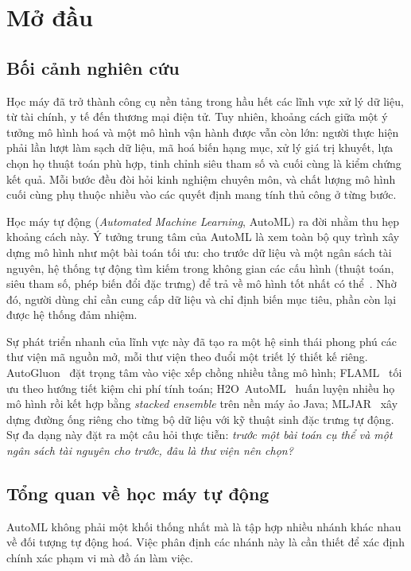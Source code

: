 \chapter{Mở đầu}
\label{ch:gioithieu}

\section{Bối cảnh nghiên cứu}
\label{sec:boicanh}
Học máy đã trở thành công cụ nền tảng trong hầu hết các lĩnh vực xử lý dữ liệu,
từ tài chính, y tế đến thương mại điện tử. Tuy nhiên, khoảng cách giữa một ý
tưởng mô hình hoá và một mô hình vận hành được vẫn còn lớn: người thực hiện phải
lần lượt làm sạch dữ liệu, mã hoá biến hạng mục, xử lý giá trị khuyết, lựa chọn
họ thuật toán phù hợp, tinh chỉnh siêu tham số và cuối cùng là kiểm chứng kết
quả. Mỗi bước đều đòi hỏi kinh nghiệm chuyên môn, và chất lượng mô hình cuối cùng
phụ thuộc nhiều vào các quyết định mang tính thủ công ở từng bước.

Học máy tự động (\textit{Automated Machine Learning}, AutoML) ra đời nhằm thu hẹp
khoảng cách này. Ý tưởng trung tâm của AutoML là xem toàn bộ quy trình xây dựng
mô hình như một bài toán tối ưu: cho trước dữ liệu và một ngân sách tài nguyên,
hệ thống tự động tìm kiếm trong không gian các cấu hình (thuật toán, siêu tham số,
phép biến đổi đặc trưng) để trả về mô hình tốt nhất có thể~\cite{feurer2015autosklearn}.
Nhờ đó, người dùng chỉ cần cung cấp dữ liệu và chỉ định biến mục tiêu, phần còn
lại được hệ thống đảm nhiệm.

Sự phát triển nhanh của lĩnh vực này đã tạo ra một hệ sinh thái phong phú các thư
viện mã nguồn mở, mỗi thư viện theo đuổi một triết lý thiết kế riêng.
AutoGluon~\cite{erickson2020autogluon} đặt trọng tâm vào việc xếp chồng nhiều
tầng mô hình; FLAML~\cite{wang2021flaml} tối ưu theo hướng tiết kiệm chi phí tính
toán; H2O~AutoML~\cite{ledell2020h2o} huấn luyện nhiều họ mô hình rồi kết hợp
bằng \textit{stacked ensemble} trên nền máy ảo Java; MLJAR~\cite{plonska2021mljar}
xây dựng đường ống riêng cho từng bộ dữ liệu với kỹ thuật sinh đặc trưng tự động.
Sự đa dạng này đặt ra một câu hỏi thực tiễn: \textit{trước một bài toán cụ thể và
một ngân sách tài nguyên cho trước, đâu là thư viện nên chọn?}

\section{Tổng quan về học máy tự động}
\label{sec:tongquan-automl}
AutoML không phải một khối thống nhất mà là tập hợp nhiều nhánh khác nhau về đối
tượng tự động hoá. Việc phân định các nhánh này là cần thiết để xác định chính xác
phạm vi mà đồ án làm việc.

